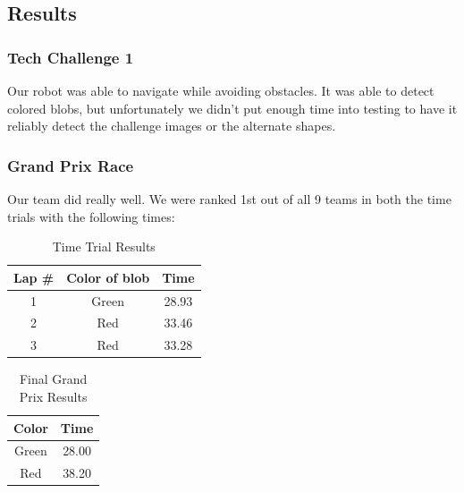 \documentclass[journal, a4paper]{IEEEtran}
\begin{document}
\subsection{Results}
\subsubsection{Tech Challenge 1}
Our robot was able to navigate while avoiding obstacles. It was able to detect colored blobs, but unfortunately we didn't put enough time into testing to have it reliably detect the challenge images or the alternate shapes.
\subsubsection{Grand Prix Race}
Our team did really well. We were ranked 1st out of all 9 teams in both the time trials with the following times:
    \begin{table}[!hbt]
        \begin{center}
        \caption{Time Trial Results}
        \begin{tabular}{|c|c|c|}
            \hline
			\textbf{Lap \#} & \textbf{Color of blob} & \textbf{Time} \\
			\hline
            1 & Green & 28.93\\
            \hline
            2 & Red & 33.46 \\
            \hline
            3 & Red & 33.28\\
            \hline
        \end{tabular}
        \end{center}
    \end{table}
    \begin{table}[!hbt]
        \begin{center}
		\caption{Final Grand Prix Results}
        \begin{tabular}{|c|c|}
            \hline
			\textbf{Color} & \textbf{Time} \\
			\hline
            Green & 28.00 \\
            \hline
            Red & 38.20 \\
            \hline
        \end{tabular}
        \end{center}
    \end{table}
\end{document}
